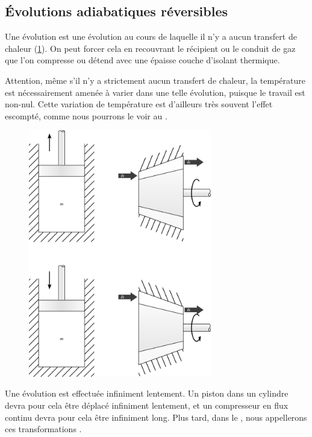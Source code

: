 	\subsection{Évolutions adiabatiques réversibles}
	\label{ch_gp_isentropiques}

		Une évolution  est une évolution au cours de laquelle il n’y a aucun transfert de chaleur (\cref{fig_gp_isentropique}). On peut forcer cela en recouvrant le récipient ou le conduit de gaz que l’on compresse ou détend avec une épaisse couche d’isolant thermique.
		
		Attention, même s’il n’y a strictement aucun transfert de chaleur, la température est nécessairement amenée à varier dans une telle évolution, puisque le travail est non-nul. Cette variation de température est d’ailleurs très souvent l’effet escompté, comme nous pourrons le voir au \courssept.
		
		\begin{figure}
			\begin{center}
				\includegraphics[width=8cm]{images/isentropique.png}
			\end{center}
			\label{fig_gp_isentropique}
		\end{figure}
		
		Une évolution  est effectuée infiniment lentement. Un piston dans un cylindre devra pour cela être déplacé infiniment lentement, et un compresseur en flux continu devra pour cela être infiniment long. Plus tard, dans le \courshuit, nous appellerons ces transformations .

